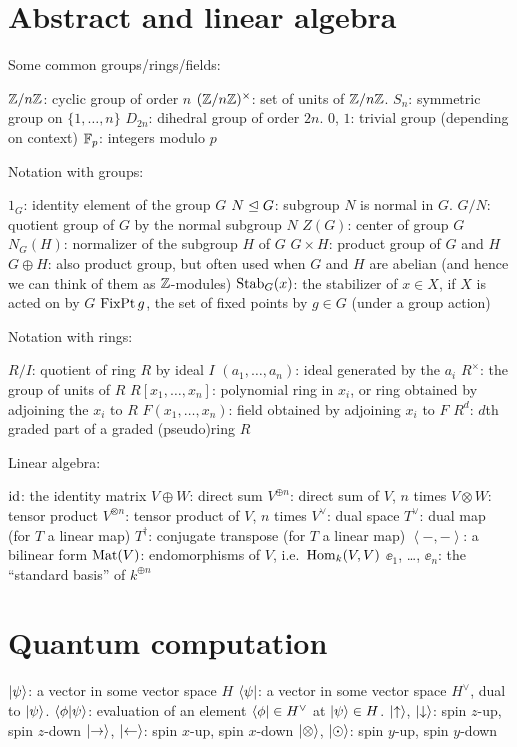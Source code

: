 \section{Abstract and linear algebra}
Some common groups/rings/fields:
\begin{itemize}
	\ii $\mathbb Z/n\mathbb Z$: cyclic group of order $n$
	\ii $(\mathbb Z/n\mathbb Z)^\times$: set of units of $\mathbb Z/n\mathbb Z$.
	\ii $S_n$: symmetric group on $\{1, \dots, n\}$
	\ii $D_{2n}$: dihedral group of order $2n$.
	\ii $0$, $1$: trivial group (depending on context)
	\ii $\mathbb F_p$: integers modulo $p$
\end{itemize}
Notation with groups:
\begin{itemize}
	\ii $1_G$: identity element of the group $G$
	\ii $N \trianglelefteq G$: subgroup $N$ is normal in $G$.
	\ii $G/N$: quotient group of $G$ by the normal subgroup $N$
	\ii $Z(G)$: center of group $G$
	\ii $N_G(H)$: normalizer of the subgroup $H$ of $G$
	\ii $G \times H$: product group of $G$ and $H$
	\ii $G \oplus H$: also product group,
	but often used when $G$ and $H$ are abelian
	(and hence we can think of them as $\mathbb Z$-modules)
	\ii $\operatorname{Stab}_G(x)$: the stabilizer of $x \in X$, if $X$ is acted on by $G$
	\ii $\operatorname{FixPt} g$, the set of fixed points by $g \in G$ (under a group action)
\end{itemize}
Notation with rings:
\begin{itemize}
	\ii $R/I$: quotient of ring $R$ by ideal $I$
	\ii $(a_1, \dots, a_n)$: ideal generated by the $a_i$
	\ii $R^\times$: the group of units of $R$
	\ii $R[x_1, \dots, x_n]$: polynomial ring in $x_i$,
	or ring obtained by adjoining the $x_i$ to $R$
	\ii $F(x_1, \dots, x_n)$: field obtained by adjoining $x_i$ to $F$
	\ii $R^d$: $d$th graded part of a graded (pseudo)ring $R$
\end{itemize}
Linear algebra:
\begin{itemize}
	\ii $\mathrm{id}$: the identity matrix
	\ii $V \oplus W$: direct sum
	\ii $V^{\oplus n}$: direct sum of $V$, $n$ times
	\ii $V \otimes W$: tensor product
	\ii $V^{\otimes n}$: tensor product of $V$, $n$ times
	\ii $V^\vee$: dual space
	\ii $T^\vee$: dual map (for $T$ a linear map)
	\ii $T^\dagger$: conjugate transpose (for $T$ a linear map)
	\ii $\left< -,-\right>$: a bilinear form
	\ii $\mathrm{Mat}(V)$: endomorphisms of $V$, i.e.\ $\operatorname{Hom}_k(V,V)$
	\ii $\ee_1$, \dots, $\ee_n$: the ``standard basis'' of $k^{\oplus n}$
\end{itemize}
\section{Quantum computation}
\begin{itemize}
	\ii $\ket{\psi}$: a vector in some vector space $H$
	\ii $\bra{\psi}$: a vector in some vector space $H^\vee$, dual to $\ket{\psi}$.
	\ii $\braket{\phi|\psi}$: evaluation of an element $\bra{\phi} \in H^\vee$ at $\ket{\psi} \in H$.
	\ii $\ket\uparrow$, $\ket\downarrow$: spin $z$-up, spin $z$-down
	\ii $\ket\rightarrow$, $\ket\leftarrow$: spin $x$-up, spin $x$-down
	\ii $\ket\otimes$, $\ket\odot$: spin $y$-up, spin $y$-down
\end{itemize}

